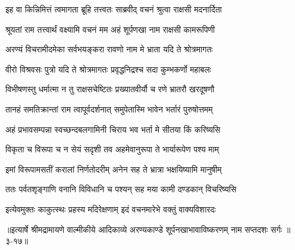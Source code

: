 \twolineshloka
{इह वा किन्निमित्तं त्वमागता ब्रूहि तत्त्वतः}
{साब्रवीद् वचनं श्रुत्वा राक्षसी मदनार्दिता} %

\twolineshloka
{श्रूयतां राम तत्त्वार्थं वक्ष्यामि वचनं मम}
{अहं शूर्पणखा नाम राक्षसी कामरूपिणी} %

\twolineshloka
{अरण्यं विचरामीदमेका सर्वभयङ्करा}
{रावणो नाम मे भ्राता यदि ते श्रोत्रमागतः} %

\twolineshloka
{वीरो विश्रवसः पुत्रो यदि ते श्रोत्रमागतः}
{प्रवृद्धनिद्रश्च सदा कुम्भकर्णो महाबलः} %

\twolineshloka
{विभीषणस्तु धर्मात्मा न तु राक्षसचेष्टितः}
{प्रख्यातवीर्यौ च रणे भ्रातरौ खरदूषणौ} %

\twolineshloka
{तानहं समतिक्रान्तां राम त्वापूर्वदर्शनात्}
{समुपेतास्मि भावेन भर्तारं पुरुषोत्तमम्} %

\twolineshloka
{अहं प्रभावसम्पन्ना स्वच्छन्दबलगामिनी}
{चिराय भव भर्ता मे सीतया किं करिष्यसि} %

\twolineshloka
{विकृता च विरूपा च न सेयं सदृशी तव}
{अहमेवानुरूपा ते भार्यारूपेण पश्य माम्} %

\twolineshloka
{इमां विरूपामसतीं करालां निर्णतोदरीम्}
{अनेन सह ते भ्रात्रा भक्षयिष्यामि मानुषीम्} %

\twolineshloka
{ततः पर्वतशृङ्गाणि वनानि विविधानि च}
{पश्यन् सह मया कामी दण्डकान् विचरिष्यसि} %

\twolineshloka
{इत्येवमुक्तः काकुत्स्थः प्रहस्य मदिरेक्षणाम्}
{इदं वचनमारेभे वक्तुं वाक्यविशारदः} %


॥इत्यार्षे श्रीमद्रामायणे वाल्मीकीये आदिकाव्ये अरण्यकाण्डे शूर्पनखाभावाविष्करणम् नाम सप्तदशः सर्गः ॥३-१७॥
